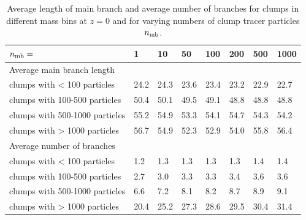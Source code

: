 \documentclass[a4paper,twocolumn,fleqn,usenatbib]{mnras}
\begin{document}
\begin{table}
  \caption{Average length of main branch and average number of
    branches for clumps in different mass bins at $z=0$ and for
    varying numbers of clump tracer particles $n_{\rm mb}$.}
  \label{tab:ntracers}

  {\small 
    \begin{tabular}[c]{l | p{1cm} | p{1cm} | p{1cm} | p{1cm} | p{1cm} | p{1cm} | p{1cm} |}
      $n_{\rm mb}=$				&	1 		& 	10 		& 	50 		& 	100 	& 200 	& 500 		& 1000 \\
      \hline
      Average main branch length & & & & & & &\\
      clumps with < 100 particles		&	24.2	& 	24.3	& 	23.6	&	23.4 	& 23.2 	& 22.9 	& 22.7  \\	
      clumps with 100-500 particles		&	50.4	& 	50.1	& 	49.5	&	49.1 	& 48.8 	& 48.8 	& 48.8  \\	
      clumps with 500-1000 particles		&	55.2	& 	54.9	& 	53.3	&	54.1 	& 54.7 	& 54.3 	& 54.2  \\	
      clumps with > 1000 particles		&	56.7	& 	54.9 	& 	52.3	&	52.9 	& 54.0 	& 55.8 	& 56.4  \\
      \hline
      Average number of branches & & & & & & &\\
      clumps with < 100 particles		&	1.2	& 	1.3	& 	1.3	&	1.3 	& 1.3  & 1.4 	& 1.4  \\	
      clumps with 100-500 particles		&	2.7	& 	3.0	& 	3.3	&	3.3 	& 3.4  & 3.6 	& 3.6  \\	
      clumps with 500-1000 particles		&	6.6	& 	7.2	& 	8.1	&	8.2 	& 8.7  & 8.9 	& 9.1  \\	
      clumps with > 1000 particles		&	20.4& 	25.2& 	27.3&	28.6 	& 29.5 & 30.4 	& 31.4 \\	
      \hline	
    \end{tabular}
  }


\end{table}
\end{document}
